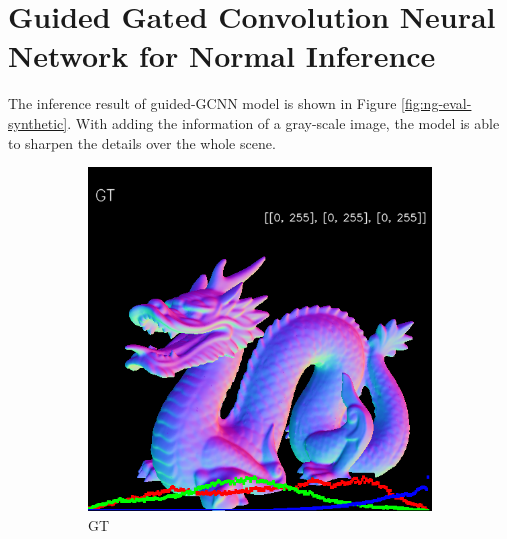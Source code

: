 \documentclass[]{article}
\begin{document}
\section{Guided Gated Convolution Neural Network for Normal Inference }

The inference result of guided-GCNN model is shown in Figure \ref{fig:ng-eval-synthetic}. With adding the information of a gray-scale image, the model is able to sharpen the details over the whole scene. 

\begin{figure}[h!]
	\centering
	\begin{subfigure}[b]{0.19\linewidth}
		\includegraphics[width=\linewidth]{./Figures/ng-synthetic/fancy_eval_3_groundtruth.png}
		\caption{GT}
	\end{subfigure}
	\begin{subfigure}[b]{0.19\linewidth}

\end{subfigure}
\end{figure}
\end{document}
